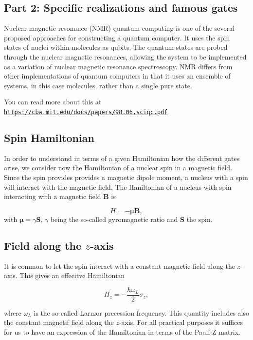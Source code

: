 \documentclass[%
oneside,                 %
final,                   %
10pt]{article}
\begin{document}
\subsection{Part 2: Specific realizations and famous gates}

Nuclear magnetic resonance (NMR) quantum computing is one of the several
proposed approaches for constructing a quantum computer. It uses the
spin states of nuclei within molecules as qubits. The quantum states
are probed through the nuclear magnetic resonances, allowing the
system to be implemented as a variation of nuclear magnetic resonance
spectroscopy. NMR differs from other implementations of quantum
computers in that it uses an ensemble of systems, in this case
molecules, rather than a single pure state.

You can read more about this at \href{{https://cba.mit.edu/docs/papers/98.06.sciqc.pdf}}{\nolinkurl{https://cba.mit.edu/docs/papers/98.06.sciqc.pdf}}

\subsection{Spin Hamiltonian}

In order to understand in terms of a given Hamiltonian how the
different gates arise, we consider now the Hamiltonian of a nuclear
spin in a magnetic field. Since the spin provides provides a magnetic
dipole moment, a nucleus with a spin will interact with the magnetic
field. The Haniltonian of a nucleus with spin interacting with a
magnetic field $\bm{B}$ is

\[
H = -\bm{\mu}\bm{B},
\]
with $\bm{\mu}=\gamma\bm{S}$, $\gamma$ being the so-called gyromagnetic ratio and $\bm{S}$ the spin.

\subsection{Field along the $z$-axis}

It is common to let the spin interact with a constant magnetic field
along the $z$-axis. This gives an effecitve Hamiltonian

\[
H_z = -\frac{\hbar\omega_L}{2}\sigma_z,
\]

where $\omega_L$ is the so-called Larmor precession frequency. This
quantity includes also the constant magnetif field along the
$z$-axis. For all practical purposes it suffices for us to have an
expression of the Hamiltonian in terms of the Pauli-Z matrix.
\end{document}
